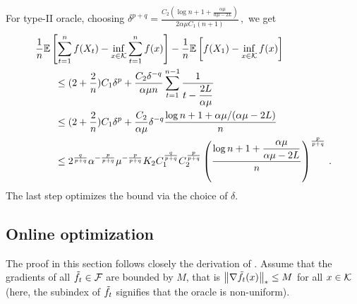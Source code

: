 For type-II oracle, choosing
$
\delta^{p+q} =  \tfrac{C_2\left( \log n+1+\tfrac{\alpha \mu}{\alpha \mu -2L}\right)}{2\alpha \mu C_1 (n+1)} \,,
$
we get
 \begin{align*}
 \MoveEqLeft
\frac{1}{n} \EE{ \sum_{t=1}^n f( X_t) - \inf_{x \in \cK} \sum_{t=1}^n f(x)} -\frac{1}{n}\EE{f(X_1)-\inf_{x \in \cK}f(x)}\\
&\le (2+\dfrac{2}{n})C_1\delta^p+\dfrac{C_2 \delta^{-q}}{\alpha \mu n} \sum_{t=1}^{n-1}\dfrac{1}{t-\dfrac{2L}{\alpha \mu}}\\
&\le (2+\dfrac{2}{n})C_1\delta^p+\dfrac{C_2 }{\alpha \mu}\delta^{-q} \dfrac{\log n+1+\alpha \mu/(\alpha \mu-2L)}{n}\\
&\le 2^{\frac{q}{p+q}}\alpha^{-\frac{p}{p+q}}\mu^{-\frac{p}{p+q}} K_2C_1^{\frac{q}{p+q}}C_2^{\frac{p}{p+q}} \left( \frac{\log n+1+\dfrac{\alpha \mu}{\alpha \mu -2L}}{n} \right)^{\frac{p}{p+q}}\,.
 \end{align*}
The last step optimizes the bound via the choice of $\delta$.



\subsection{Online optimization}
The proof in this section follows closely the derivation of \citet{saha2011improved}.
Assume that the gradients of all $\tilde{f}_t \in \mathcal{F}$ are bounded by $M$, that is $\left\|\nabla \tilde{f}_t(x)\right\|_* \le M$ for all $x \in \mathcal{K}$ (here, the subindex of $\tilde{f}_t$ signifies that the oracle is non-uniform).

